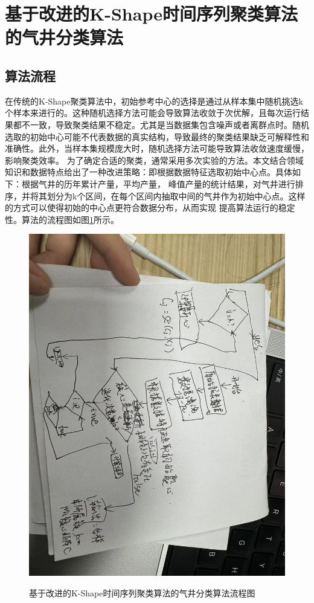 \section{基于改进的K-Shape时间序列聚类算法的气井分类算法}
\subsection{算法流程}
在传统的K-Shape聚类算法中，初始参考中心的选择是通过从样本集中随机挑选k个样本来进行的。这种随机选择方法可能会导致算法收敛于次优解，且每次运行结果都不一致，导致聚类结果不稳定。尤其是当数据集包含噪声或者离群点时。随机选取的初始中心可能不代表数据的真实结构，导致最终的聚类结果缺乏可解释性和准确性。此外，当样本集规模庞大时，随机选择方法可能导致算法收敛速度缓慢，影响聚类效率。
为了确定合适的聚类，通常采用多次实验的方法。本文结合领域知识和数据特点给出了一种改进策略：即根据数据特征选取初始中心点。具体如下：根据气井的历年累计产量，平均产量，
峰值产量的统计结果，对气井进行排序，并将其划分为k个区间，在每个区间内抽取中间的气井作为初始中心点。这样的方式可以使得初始的中心点更符合数据分布，从而实现
提高算法运行的稳定性。算法的流程图如图\ref{fig:K-Shape}所示。
\begin{figure}
    \centering
    \includegraphics[scale=0.3,angle=0]{figure/K-Shape.jpg}\\
    \caption{基于改进的K-Shape时间序列聚类算法的气井分类算法流程图}
    \label{fig:K-Shape}
\end{figure}
